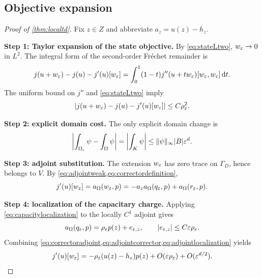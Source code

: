 \subsection{Objective expansion}

\begin{proof}[Proof of \cref{thm:localtd}]
Fix $z\in Z$ and abbreviate $a_z=u(z)-h_z$.

\textbf{Step 1: Taylor expansion of the state objective.}
By \cref{eq:stateLtwo}, $w_\varepsilon\to0$ in $L^2$.  The integral form of the
second-order Fr\'echet remainder is
\begin{equation}
 j(u+w_\varepsilon)-j(u)-j'(u)[w_\varepsilon]
 =\int_0^1(1-t)j''(u+tw_\varepsilon)[w_\varepsilon,w_\varepsilon]\,\mathrm dt.
\end{equation}
The uniform bound on $j''$ and \cref{eq:stateLtwo} imply
\begin{equation}
 |j(u+w_\varepsilon)-j(u)-j'(u)[w_\varepsilon]|
 \le C\rho_\varepsilon^2.
 \label{eq:objectiveTaylorbound}
\end{equation}

\textbf{Step 2: explicit domain cost.}
The only explicit domain change is
\begin{equation}
 \left|\int_{\Omega_\varepsilon}\psi-\int_\Omega\psi\right|
 =\left|\int_K\psi\right|
 \le\|\psi\|_\infty|B|\varepsilon^d.
 \label{eq:domaincostbound}
\end{equation}

\textbf{Step 3: adjoint substitution.}
The extension $w_\varepsilon$ has zero trace on $\Gamma_D$, hence belongs to $V$.
By \cref{eq:adjointweak,eq:correctordefinition},
\begin{equation}
 j'(u)[w_\varepsilon]
 =a_\Omega(w_\varepsilon,p)
 =-a_z a_\Omega(q_\varepsilon,p)+a_\Omega(r_\varepsilon,p).
 \label{eq:adjointcorrector}
\end{equation}

\textbf{Step 4: localization of the capacitary charge.}
Applying \cref{eq:capacitylocalization} to the locally $C^1$ adjoint gives
\begin{equation}
 a_\Omega(q_\varepsilon,p)
 =\rho_\varepsilon p(z)+e_{\varepsilon,z},
 \qquad |e_{\varepsilon,z}|\le C\varepsilon\rho_\varepsilon.
 \label{eq:adjointlocalization}
\end{equation}
Combining \cref{eq:correctoradjoint,eq:adjointcorrector,eq:adjointlocalization}
yields
\begin{equation}
 j'(u)[w_\varepsilon]
 =-\rho_\varepsilon(u(z)-h_z)p(z)
  +O(\varepsilon\rho_\varepsilon)+O(\varepsilon^{d/2}).
 \label{eq:firstvariationfinal}
\end{equation}


\end{proof}
